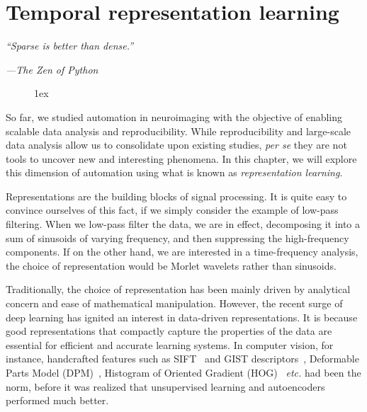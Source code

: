 \chapter{Temporal representation learning}
\label{chapter:alphacsc}

\epigraph{\small\itshape \hspace{100pt} ``Sparse is better than dense.''}{\small\textit{---The Zen of Python}}

\begin{figure}[ht!]
\centering
\begingroup
\etocstandardlines
\renewcommand{\etocbelowtocskip}{0pt\relax}
\fboxsep1ex
\localtableofcontents
\endgroup
\end{figure}

\clearpage
So far, we studied automation in neuroimaging with the objective of enabling scalable data analysis and reproducibility. While  reproducibility and large-scale data analysis allow us to consolidate upon existing studies, \emph{per se} they are not tools to uncover new and interesting phenomena. In this chapter, we will explore this dimension of automation using what is known as \emph{representation learning}.

Representations are the building blocks of signal processing. It is quite easy to convince ourselves of this fact, if we simply consider the example of low-pass filtering. When we low-pass filter the data, we are in effect, decomposing it into a sum of sinusoids of varying frequency, and then suppressing the high-frequency components. If on the other hand, we are interested in a time-frequency analysis, the choice of representation would be Morlet wavelets rather than sinusoids.

Traditionally, the choice of representation has been mainly driven by analytical concern and ease of mathematical manipulation. However, the recent surge of deep learning has ignited an interest in data-driven representations. It is because good representations  that compactly capture the properties of the data are essential for efficient and accurate learning systems. In computer vision, for instance, handcrafted features such as SIFT~\citep{lowe1999object} and GIST descriptors~\citep{oliva2001modeling}, Deformable Parts Model (DPM)~\citep{felzenszwalb2010object}, Histogram of Oriented Gradient (HOG)~\citep{dalal2005histograms} \emph{etc.} had been the norm, before it was realized that unsupervised learning and autoencoders performed much better.

